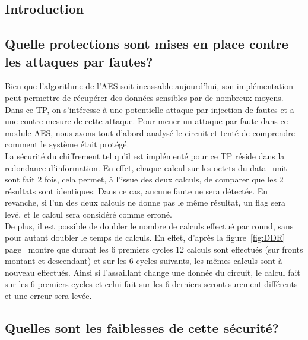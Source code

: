 \subsection{Introduction}

\subsection{Quelle protections sont mises en place contre les attaques par fautes?}

Bien que l'algorithme de l'AES soit incassable aujourd'hui, son implémentation peut permettre de récupérer des données sensibles par de nombreux moyens.
Dans ce TP, on s'intéresse à une potentielle attaque par injection de fautes et a une contre-mesure de cette attaque.
Pour mener un attaque par faute  dans ce module AES, nous avons tout d'abord analysé le circuit et tenté de comprendre comment le système était protégé.\\

La sécurité du chiffrement tel qu'il est implémenté pour ce TP réside dans la redondance d'information.
En effet, chaque calcul sur les octets du data\_unit sont fait 2 fois, cela permet, à l'issue des deux calculs, de comparer que les 2 résultats sont identiques.
Dans ce cas, aucune faute ne sera détectée. En revanche, si l'un des deux calculs ne donne pas le même résultat, un flag sera levé, et le calcul sera considéré comme erroné.\\

De plus, il est possible de doubler le nombre de calculs effectué par round, sans pour autant doubler le temps de calculs.
En effet, d'après la figure~\ref{fig:DDR} page~\pageref{fig:DDR} montre que durant les 6 premiers cycles 12 calculs sont effectués (sur fronts montant et descendant)
et sur les 6 cycles suivants, les mêmes calculs sont à nouveau effectués.
Ainsi si l'assaillant change une donnée du circuit, le calcul fait sur les 6 premiers cycles et celui fait sur les 6 derniers seront surement différents et une erreur sera levée.


\subsection{Quelles sont les faiblesses de cette sécurité?}

